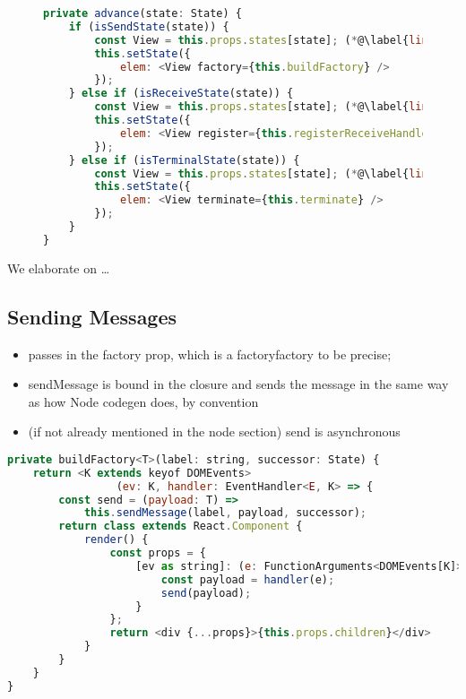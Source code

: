 \begin{figure}[!h]
\begin{lstlisting}[language=javascript]
private advance(state: State) {
	if (isSendState(state)) {
		const View = this.props.states[state]; (*@\label{line:reactadvance1}@*)
		this.setState({	
			elem: <View factory={this.buildFactory} />
		});
	} else if (isReceiveState(state)) {
		const View = this.props.states[state]; (*@\label{line:reactadvance2}@*)
		this.setState({
			elem: <View register={this.registerReceiveHandler} />
		});
	} else if (isTerminalState(state)) {
		const View = this.props.states[state]; (*@\label{line:reactadvance3}@*)
		this.setState({
			elem: <View terminate={this.terminate} />
		});
	}
}
\end{lstlisting}
\label{lst:reacttransitionfunc}
\end{figure}

We elaborate on \dots

\subsection{Sending Messages}
\begin{itemize}
\item passes in the factory prop, which is a factoryfactory to be precise;
\item sendMessage is bound in the closure and sends the message in the same way as how Node codegen does, by convention
\item (if not already mentioned in the node section) send is asynchronous
\end{itemize}

\begin{lstlisting}[language=javascript,tabsize=2]
private buildFactory<T>(label: string, successor: State) {
	return <K extends keyof DOMEvents>
				 (ev: K, handler: EventHandler<E, K> => {
		const send = (payload: T) => 
			this.sendMessage(label, payload, successor);
		return class extends React.Component {
			render() {
				const props = {
					[ev as string]: (e: FunctionArguments<DOMEvents[K]>) => {
						const payload = handler(e);
						send(payload);
					}
				};
				return <div {...props}>{this.props.children}</div>
			}		
		}	
	}
}
\end{lstlisting}

